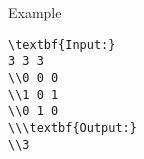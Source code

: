 Example
\begin{verbatim}
\textbf{Input:}
3 3 3
\\0 0 0
\\1 0 1
\\0 1 0
\\\textbf{Output:}
\\3
\end{verbatim}